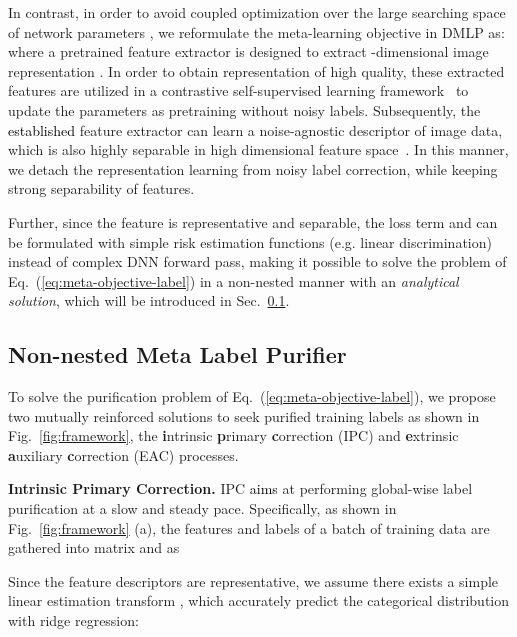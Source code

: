 \documentclass[10pt,twocolumn,letterpaper]{article}
\newcommand{\leone}[1]{\textcolor{black}{#1}}
\newcommand{\zbsN}[1]{\textcolor{black}{#1}}
\begin{document}
{In contrast, in order to avoid coupled optimization over the large searching space of network parameters , we reformulate the meta-learning objective in DMLP as:}
 \\
where a pretrained feature extractor  is designed to extract -dimensional image representation . In order to obtain representation of high quality, these extracted features are utilized in a {contrastive} self-supervised learning {framework}~\cite{chen2020simple,2020MoCo-v2} to update the parameters  as pretraining without noisy labels. Subsequently, the \zbsN{established} feature extractor  can learn a noise-agnostic descriptor of image data, which is also highly separable in high dimensional feature space~\cite{zhang2020decoupling}. In this manner, we detach the representation learning from noisy label correction, while keeping strong separability of features.

{Further, since the feature is representative and separable, the loss term  and  can be formulated with simple  risk estimation functions (e.g. linear discrimination) instead of complex DNN forward pass, making it possible to solve the problem of Eq.~(\ref{eq:meta-objective-label}) in a non-nested manner with an \emph{analytical solution}, which will be introduced in Sec.~\ref{stage2}.}\\






\vspace{-.3em}
\subsection{Non-nested Meta Label Purifier} \label{stage2}
To solve the purification problem of Eq.~(\ref{eq:meta-objective-label}), we propose two mutually reinforced solutions to seek purified training labels as shown in Fig.~\ref{fig:framework}, the \textbf{i}ntrinsic \textbf{p}rimary \textbf{c}orrection (IPC) and \textbf{e}xtrinsic \textbf{a}uxiliary \textbf{c}orrection (EAC) processes.

\textbf{Intrinsic Primary Correction.} IPC \leone{aims} at performing global-wise label purification at a slow and steady pace.
Specifically, as shown in Fig.~\ref{fig:framework} (a), {the features and labels of a batch of  training data are gathered into matrix  and  as}



{Since the feature descriptors are representative, we assume there exists a simple linear estimation transform , which accurately predict the categorical distribution with ridge regression:}
\end{document}
